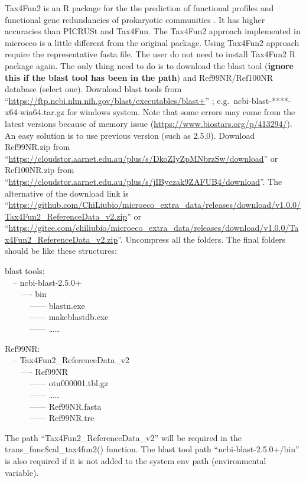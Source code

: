 \documentclass[
]{book}
\begin{document}
Tax4Fun2 is an R package for the the prediction of functional profiles and functional gene redundancies of prokaryotic communities \citep{Wemheuer_Tax4Fun2_2020}.
It has higher accuracies than PICRUSt and Tax4Fun. The Tax4Fun2 approach implemented in microeco is a little different from the original package.
Using Tax4Fun2 approach require the representative fasta file.
The user do not need to install Tax4Fun2 R package again.
The only thing need to do is to download the blast tool (\textbf{ignore this if the blast tool has been in the path}) and Ref99NR/Ref100NR database (select one).
Download blast tools from ``\url{https://ftp.ncbi.nlm.nih.gov/blast/executables/blast+}'' ; e.g.~ncbi-blast-****-x64-win64.tar.gz for windows system.
Note that some errors may come from the latest versions because of memory issue (\url{https://www.biostars.org/p/413294/}).
An easy solution is to use previous version (such as 2.5.0).
Download Ref99NR.zip from ``\url{https://cloudstor.aarnet.edu.au/plus/s/DkoZIyZpMNbrzSw/download}'' or Ref100NR.zip from ``\url{https://cloudstor.aarnet.edu.au/plus/s/jIByczak9ZAFUB4/download}''.
The alternative of the download link is ``\url{https://github.com/ChiLiubio/microeco_extra_data/releases/download/v1.0.0/Tax4Fun2_ReferenceData_v2.zip}'' or
``\url{https://gitee.com/chiliubio/microeco_extra_data/releases/download/v1.0.0/Tax4Fun2_ReferenceData_v2.zip}''.
Uncompress all the folders. The final folders should be like these structures:

blast tools:\\
　\textbar-- ncbi-blast-2.5.0+\\
　　\textbar---- bin\\
　　　\textbar------ blastn.exe\\
　　　\textbar------ makeblastdb.exe\\
　　　\textbar------ \ldots\ldots{}

Ref99NR:\\
　\textbar-- Tax4Fun2\_ReferenceData\_v2\\
　　\textbar---- Ref99NR\\
　　　\textbar------ otu000001.tbl.gz\\
　　　\textbar------ \ldots\ldots{}\\
　　　\textbar------ Ref99NR.fasta\\
　　　\textbar------ Ref99NR.tre

The path ``Tax4Fun2\_ReferenceData\_v2'' will be required in the trans\_func\$cal\_tax4fun2() function.
The blast tool path ``ncbi-blast-2.5.0+/bin'' is also required if it is not added to the system env path (environmental variable).
\end{document}
